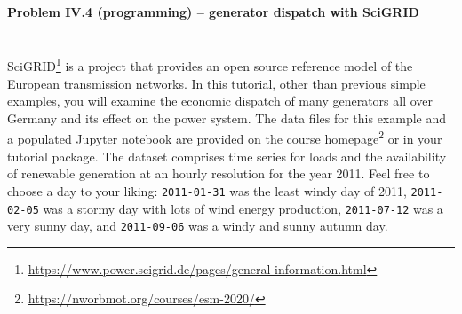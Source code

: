 \documentclass[11pt,a4paper,fleqn]{scrartcl}
\begin{document}
\newpage

\paragraph{Problem IV.4 (programming) -- generator dispatch with SciGRID \faHome}~\\

SciGRID\footnote{\url{https://www.power.scigrid.de/pages/general-information.html}} is a project that provides an open source reference model of the European transmission networks. In this tutorial, other than previous simple examples, you will examine the economic dispatch of many generators all over Germany and its effect on the power system. The data files for this example and a populated Jupyter notebook are provided on the course homepage\footnote{\url{https://nworbmot.org/courses/esm-2020/}} or in your tutorial package. The dataset comprises time series for loads and the availability of renewable generation at an hourly resolution for the year 2011. Feel free to choose a day to your liking: \texttt{2011-01-31} was the least windy day of 2011, \texttt{2011-02-05} was a stormy day with lots of wind energy production, \texttt{2011-07-12} was a very sunny day, and \texttt{2011-09-06} was a windy and sunny autumn day.
\end{document}
